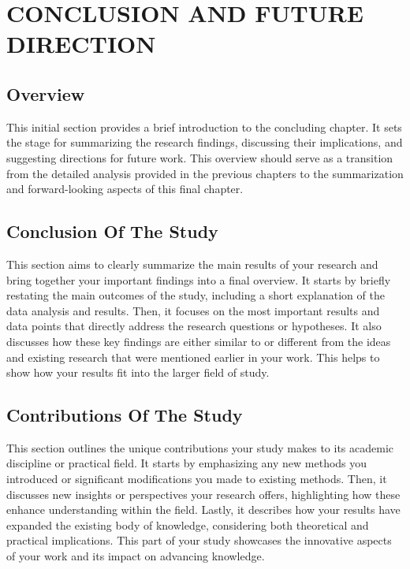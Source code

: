 \chapter{CONCLUSION AND FUTURE DIRECTION}
\label{ch6}

\section{Overview}
This initial section provides a brief introduction to the concluding chapter. It sets the stage for summarizing the research findings, discussing their implications, and suggesting directions for future work. This overview should serve as a transition from the detailed analysis provided in the previous chapters to the summarization and forward-looking aspects of this final chapter.



\section{Conclusion Of The Study}

This section aims to clearly summarize the main results of your research and bring together your important findings into a final overview. It starts by briefly restating the main outcomes of the study, including a short explanation of the data analysis and results. Then, it focuses on the most important results and data points that directly address the research questions or hypotheses. It also discusses how these key findings are either similar to or different from the ideas and existing research that were mentioned earlier in your work. This helps to show how your results fit into the larger field of study.


\section{Contributions Of The Study}

This section outlines the unique contributions your study makes to its academic discipline or practical field. It starts by emphasizing any new methods you introduced or significant modifications you made to existing methods. Then, it discusses new insights or perspectives your research offers, highlighting how these enhance understanding within the field. Lastly, it describes how your results have expanded the existing body of knowledge, considering both theoretical and practical implications. This part of your study showcases the innovative aspects of your work and its impact on advancing knowledge.

